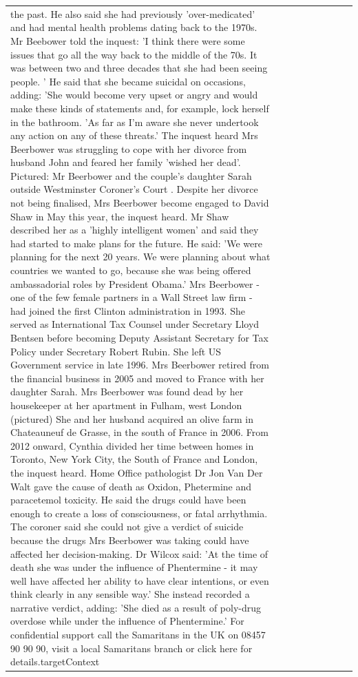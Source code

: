 \begin{table}[H]
\begin{tabular}{lllrlllll}
the past. He also said she had previously 'over-medicated' and had mental health problems dating back to the 1970s. Mr Beebower told the inquest: 'I think there were some issues that go all the way back to the middle of the 70s. It was between two and three decades that she had been seeing people. ' He said that she became suicidal on occasions, adding: 'She would become very upset or angry and would make these kinds of statements and, for example, lock herself in the bathroom. 'As far as I'm aware she never undertook any action on any of these threats.' The inquest heard Mrs Beerbower was struggling to cope with her divorce from husband John and feared her family 'wished her dead'. Pictured: Mr Beerbower and the couple's daughter Sarah outside Westminster Coroner's Court . Despite her divorce not being finalised, Mrs Beerbower become engaged to David Shaw in May this year, the inquest heard. Mr Shaw described her as a 'highly intelligent women' and said they had started to make plans for the future. He said: 'We were planning for the next 20 years. We were planning about what countries we wanted to go, because she was being offered ambassadorial roles by President Obama.' Mrs Beerbower - one of the few female partners in a Wall Street law firm - had joined the first Clinton administration in 1993. She served as International Tax Counsel under Secretary Lloyd Bentsen before becoming Deputy Assistant Secretary for Tax Policy under Secretary Robert Rubin. She left US Government service in late 1996. Mrs Beerbower retired from the financial business in 2005 and moved to France with her daughter Sarah. Mrs Beerbower was found dead by her housekeeper at her apartment in Fulham, west London (pictured) She and her husband acquired an olive farm in Chateauneuf de Grasse, in the south of France in 2006. From 2012 onward, Cynthia divided her time between homes in Toronto, New York City, the South of France and London, the inquest heard. Home Office pathologist Dr Jon Van Der Walt gave the cause of death as Oxidon, Phetermine and paracetemol toxicity. He said the drugs could have been enough to create a loss of consciousness, or fatal arrhythmia. The coroner said she could not give a verdict of suicide because the drugs Mrs Beerbower was taking could have affected her decision-making. Dr Wilcox said: 'At the time of death she was under the influence of Phentermine - it may well have affected her ability to have clear intentions, or even think clearly in any sensible way.' She instead recorded a narrative verdict, adding: 'She died as a result of poly-drug overdose while under the influence of Phentermine.' For confidential support call the Samaritans in the UK on 08457 90 90 90, visit a local Samaritans branch or click here for details.targetContext \\

\end{tabular}
\end{table}
